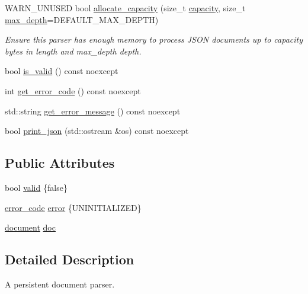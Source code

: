 \begin{DoxyCompactItemize}
W\+A\+R\+N\+\_\+\+U\+N\+U\+S\+ED bool \hyperlink{classsimdjson_1_1document_1_1parser_af1e347c307036b644ed92f8bb575c4e9}{allocate\+\_\+capacity} (size\+\_\+t \hyperlink{classsimdjson_1_1document_1_1parser_af9ea6b75fa9c41c6633fdcf059744cb2}{capacity}, size\+\_\+t \hyperlink{classsimdjson_1_1document_1_1parser_ae3ccf7ff0c0aa18d6ba70d3e063461b7}{max\+\_\+depth}=D\+E\+F\+A\+U\+L\+T\+\_\+\+M\+A\+X\+\_\+\+D\+E\+P\+TH)
\begin{DoxyCompactList}\small\item\em Ensure this parser has enough memory to process J\+S\+ON documents up to {\ttfamily capacity} bytes in length and {\ttfamily max\+\_\+depth} depth. \end{DoxyCompactList}\item 
bool \hyperlink{classsimdjson_1_1document_1_1parser_af8bc0c415446f61d6be1a2e3f60a13ad}{is\+\_\+valid} () const noexcept
\item 
int \hyperlink{classsimdjson_1_1document_1_1parser_ae22eec3516e3b91d62b5e275bdb58e71}{get\+\_\+error\+\_\+code} () const noexcept
\item 
std\+::string \hyperlink{classsimdjson_1_1document_1_1parser_ab971378e4a9496980632c2cbed66e992}{get\+\_\+error\+\_\+message} () const noexcept
\item 
bool \hyperlink{classsimdjson_1_1document_1_1parser_ad6f0ed13d1344e219ba76c491158a05c}{print\+\_\+json} (std\+::ostream \&os) const noexcept
\end{DoxyCompactItemize}
\subsection*{Public Attributes}
\begin{DoxyCompactItemize}
\item 
bool \hyperlink{classsimdjson_1_1document_1_1parser_a1aaf05806149d370d15140125038d3b2}{valid} \{false\}
\item 
\hyperlink{namespacesimdjson_a7b735a3a50ba79e3f7f14df5f77d8da9}{error\+\_\+code} \hyperlink{classsimdjson_1_1document_1_1parser_afa18e48f1df491d56afdfea2fa353e05}{error} \{U\+N\+I\+N\+I\+T\+I\+A\+L\+I\+Z\+ED\}
\item 
\hyperlink{classsimdjson_1_1document}{document} \hyperlink{classsimdjson_1_1document_1_1parser_a689e8f23f1e1b63f9e8a3c68ad9517a2}{doc}
\end{DoxyCompactItemize}


\subsection{Detailed Description}
A persistent document parser. 

